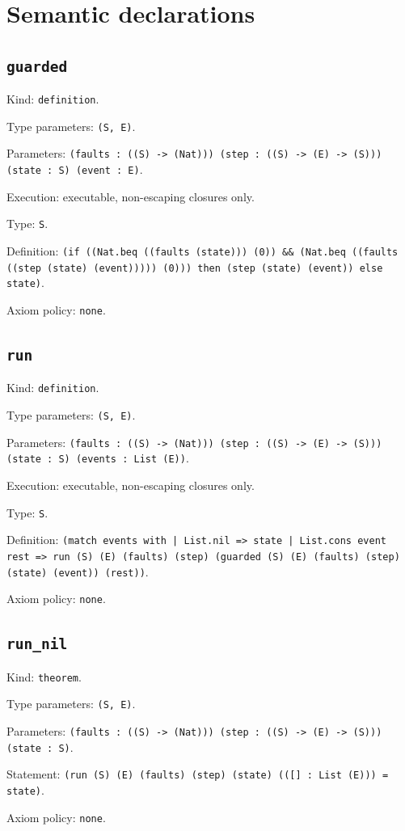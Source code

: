 \documentclass[11pt]{article}
\begin{document}
\section*{Semantic declarations}
\subsection*{\texttt{guarded}}
\noindent Kind: \texttt{definition}.\par
\noindent Type parameters: \texttt{(S, E)}.\par
\noindent Parameters: \texttt{(faults : ((S) -> (Nat))) (step : ((S) -> (E) -> (S))) (state : S) (event : E)}.\par
\noindent Execution: executable, non-escaping closures only.\par
\noindent Type: \texttt{S}.\par
\noindent Definition: \texttt{(if ((Nat.beq ((faults (state))) (0)) \&\& (Nat.beq ((faults ((step (state) (event))))) (0))) then (step (state) (event)) else state)}.\par
\noindent Axiom policy: \texttt{none}.\par
\subsection*{\texttt{run}}
\noindent Kind: \texttt{definition}.\par
\noindent Type parameters: \texttt{(S, E)}.\par
\noindent Parameters: \texttt{(faults : ((S) -> (Nat))) (step : ((S) -> (E) -> (S))) (state : S) (events : List (E))}.\par
\noindent Execution: executable, non-escaping closures only.\par
\noindent Type: \texttt{S}.\par
\noindent Definition: \texttt{(match events with | List.nil => state | List.cons event rest => run (S) (E) (faults) (step) (guarded (S) (E) (faults) (step) (state) (event)) (rest))}.\par
\noindent Axiom policy: \texttt{none}.\par
\subsection*{\texttt{run\_nil}}
\noindent Kind: \texttt{theorem}.\par
\noindent Type parameters: \texttt{(S, E)}.\par
\noindent Parameters: \texttt{(faults : ((S) -> (Nat))) (step : ((S) -> (E) -> (S))) (state : S)}.\par
\noindent Statement: \texttt{(run (S) (E) (faults) (step) (state) (([] : List (E))) = state)}.\par
\noindent Axiom policy: \texttt{none}.\par
\end{document}
